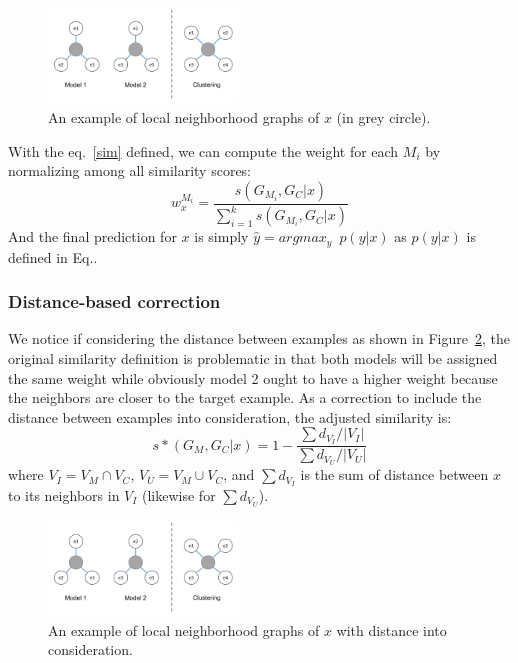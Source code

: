 \begin{figure}[h]
\centering
    \includegraphics[width=0.45\textwidth]{./fig/lwe_graph}
\caption{An example of local neighborhood graphs of $x$ (in grey circle).}
\label{fig:graph}
\end{figure}

With the eq.~\ref{sim} defined, we can compute the weight for each $M_i$ by normalizing among all similarity scores:
\begin{equation}\label{sim}
w_{x}^{M_i} = \frac {s(G_{M_i}, G_C|x)} {\sum_{i=1}^k s(G_{M_i}, G_C|x)}
\end{equation}
And the final prediction for $x$ is simply $\hat y = argmax_y \enspace p(y|x)$ as $p(y|x)$ is defined in Eq.\label{lwe}.

\subsubsection{Distance-based correction}
We notice if considering the distance between examples as shown in Figure~\ref{graph_dist}, the original similarity definition is problematic in that both models will be assigned the same weight while obviously model 2 ought to have a higher weight because the neighbors are closer to the target example.
As a correction to include the distance between examples into consideration, the adjusted similarity is:
\begin{equation}\label{sim}
s\ast(G_M, G_C|x) = 1 - \frac {\sum d_{V_I}/|V_I|} {\sum d_{V_U}/|V_U|}
\end{equation}
where $V_I = V_M \cap V_C$, $V_U = V_M \cup V_C$, and $\sum d_{V_I}$ is the sum of distance between $x$ to its neighbors in $V_I$ (likewise for $\sum d_{V_U}$).

\begin{figure}[h]
\centering
    \includegraphics[width=0.45\textwidth]{./fig/lwe_graph}
\caption{An example of local neighborhood graphs of $x$ with distance into consideration.}
\label{graph_dist}
\end{figure}

